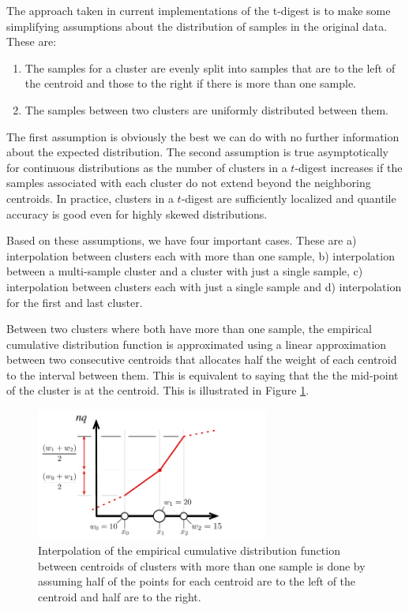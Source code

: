 \documentclass[]{statsoc}
\begin{document}
The approach taken in current implementations of the t-digest is to make some simplifying assumptions about the distribution of samples in the original data. These are:
\begin{enumerate}
\item The samples for a cluster are evenly split into samples that are to the left of the centroid and those to the right if there is more than one sample. 
\item The samples between two clusters are uniformly distributed between them. 
\end{enumerate}
The first assumption is obviously the best we can do with no further information about the expected distribution. The second assumption is true asymptotically for continuous distributions as the number of clusters in a $t$-digest increases if the samples associated with each cluster do not extend beyond the neighboring centroids. In practice, clusters in a $t$-digest are sufficiently localized and quantile accuracy is good even for highly skewed distributions.

Based on these assumptions, we have four important cases. These are a) interpolation between clusters each with more than one sample, b) interpolation between a multi-sample cluster and a cluster with just a single sample, c) interpolation between clusters each with just a single sample and d) interpolation for the first and last cluster.

Between two clusters where both have more than one sample, the empirical cumulative distribution function is approximated using a linear approximation between two consecutive centroids that allocates half the weight of each centroid to the interval between them. This is equivalent to saying that the the mid-point of the cluster is at the centroid. This is illustrated in Figure \ref{fig:interpolation}. 
\begin{figure}[htb] %
   \centering
   \includegraphics[width=3in]{quantile-figures/interpolation.pdf} 
   \caption{Interpolation of the empirical cumulative distribution function between centroids of clusters with more than one sample is done by assuming half of the points for each centroid are to the left of the centroid and half are to the right. }
   \label{fig:interpolation}
\end{figure}
\end{document}
